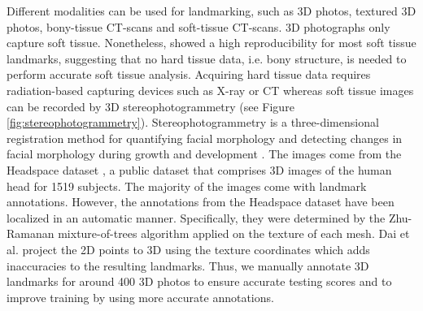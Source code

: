 Different modalities can be used for landmarking, such as 3D photos, textured 3D photos, bony-tissue CT-scans and soft-tissue CT-scans. 3D photographs only capture soft tissue. Nonetheless, \cite{Plooij2009} showed a high reproducibility for most soft tissue landmarks, suggesting that no hard tissue data, i.e. bony structure, is needed to perform accurate soft tissue analysis. Acquiring hard tissue data requires radiation-based capturing devices such as X-ray or CT whereas soft tissue images can be recorded by 3D stereophotogrammetry (see Figure \ref{fig:stereophotogrammetry}). Stereophotogrammetry is a three-dimensional registration method for quantifying facial morphology and detecting changes in facial morphology during growth and development \cite{Ras1996}.
The images come from the Headspace dataset \cite{Dai2019}, a public dataset that comprises 3D images of the human head for 1519 subjects. The majority of the images come with landmark annotations. However, the annotations from the Headspace dataset have been localized in an automatic manner. Specifically, they were determined by the Zhu-Ramanan mixture-of-trees algorithm \cite{Zhu2012} applied on the texture of each mesh. Dai et al. project the 2D points to 3D using the texture coordinates which adds inaccuracies to the resulting landmarks. Thus, we manually annotate 3D landmarks for around 400 3D photos to ensure accurate testing scores and to improve training by using more accurate annotations.

